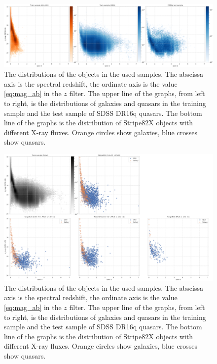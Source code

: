 \documentclass[fleqn,usenatbib]{mnras}
\begin{document}
\begin{figure}
    \centering
    \includegraphics[width=0.95\linewidth]{images/data-dist-ab-upsidedown-dr16.png}
    \caption{The distributions of the objects in the used samples. The abscissa axis is the spectral redshift, the ordinate axis is the value \eqref{eq:mag_ab} in the $z$ filter. The upper line of the graphs, from left to right, is the distributions of galaxies and quasars in the training sample and the test sample of SDSS DR16q quasars.  The bottom line of the graphs is the distribution of Stripe82X objects with different X-ray fluxes. Orange circles show galaxies, blue crosses show quasars.}
    \label{fig:data_distribution}
\end{figure}

\begin{figure}
    \centering
    \includegraphics[width=0.95\linewidth]{images/data-dist-ab-upsidedown-s82x.png}
    \caption{The distributions of the objects in the used samples. The abscissa axis is the spectral redshift, the ordinate axis is the value \eqref{eq:mag_ab} in the $z$ filter. The upper line of the graphs, from left to right, is the distributions of galaxies and quasars in the training sample and the test sample of SDSS DR16q quasars.  The bottom line of the graphs is the distribution of Stripe82X objects with different X-ray fluxes. Orange circles show galaxies, blue crosses show quasars.}
    \label{fig:data_distribution}
\end{figure}
\end{document}

